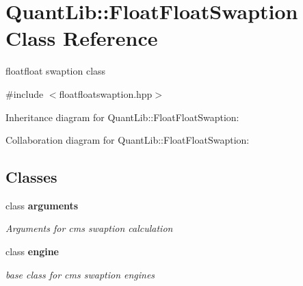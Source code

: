 \section{Quant\+Lib\+:\+:Float\+Float\+Swaption Class Reference}
\label{class_quant_lib_1_1_float_float_swaption}


floatfloat swaption class  




{\ttfamily \#include $<$floatfloatswaption.\+hpp$>$}



Inheritance diagram for Quant\+Lib\+:\+:Float\+Float\+Swaption\+:


Collaboration diagram for Quant\+Lib\+:\+:Float\+Float\+Swaption\+:
\subsection*{Classes}
\begin{DoxyCompactItemize}
\item 
class {\bf arguments}
\begin{DoxyCompactList}\small\item\em Arguments for cms swaption calculation \end{DoxyCompactList}\item 
class {\bf engine}
\begin{DoxyCompactList}\small\item\em base class for cms swaption engines \end{DoxyCompactList}\end{DoxyCompactItemize}
